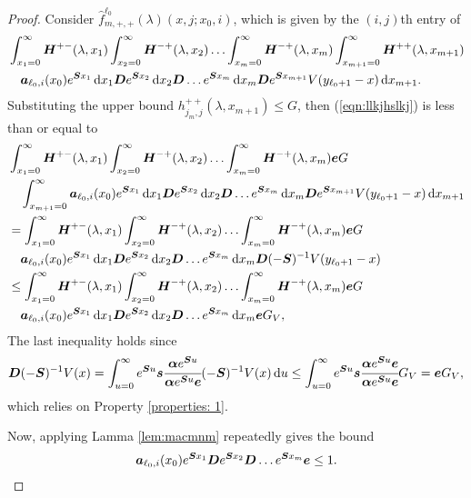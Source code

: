 \begin{proof}
	Consider \(\widehat f^{\ell_0}_{m,+,+}(\lambda)(x,j;x_0,i) \), which is given by the \((i,j)\)th entry of
        \begin{align}
        	&\int_{x_1=0}^\infty \boldsymbol H^{+-}(\lambda,x_1)\nonumber
	\int_{x_2=0}^\infty \boldsymbol H^{-+}(\lambda,x_2) 
	\hdots \int_{x_m=0}^\infty \boldsymbol H^{-+}(\lambda, x_m) 
	\int_{x_{m+1}=0}^\infty \boldsymbol H^{++}(\lambda,x_{m+1}) 
	\\&\quad\boldsymbol   a_{\ell_0,i}(x_0)e^{\boldsymbol{S}x_1}\, \mathrm{d} x_1 \boldsymbol{D}e^{\boldsymbol{S}x_2} \, \mathrm{d} x_2 \boldsymbol{D}\dots e^{\boldsymbol{S}x_m} \, \mathrm{d} x_m \boldsymbol{D}e^{\boldsymbol{S}x_{m+1}}V(y_{\ell_0+1}-x) \, \mathrm{d} x_{m+1}. \label{eqn:llkjhslkj}
\end{align}
	Substituting the upper bound \(h^{++}_{j_m,j}(\lambda,x_{m+1})\leq G\), then (\ref{eqn:llkjhslkj}) is less than or equal to 
	\begin{align}
	&\int_{x_1=0}^\infty \boldsymbol H^{+-}(\lambda,x_1)\nonumber
	\int_{x_2=0}^\infty \boldsymbol H^{-+}(\lambda,x_2) 
	\hdots \int_{x_m=0}^\infty \boldsymbol H^{-+}(\lambda, x_m) \boldsymbol eG
	\\&\quad\int_{x_{m+1}=0}^\infty \boldsymbol   a_{\ell_0,i}(x_0)e^{\boldsymbol{S}x_1}\, \mathrm{d} x_1 \boldsymbol{D}e^{\boldsymbol{S}x_2} \, \mathrm{d} x_2 \boldsymbol{D}\dots e^{\boldsymbol{S}x_m} \, \mathrm{d} x_m \boldsymbol{D}e^{\boldsymbol{S}x_{m+1}}V(y_{\ell_0+1}-x)\, \mathrm{d} x_{m+1} \nonumber
	\\&=\int_{x_1=0}^\infty \boldsymbol H^{+-}(\lambda,x_1)\nonumber
	\int_{x_2=0}^\infty \boldsymbol H^{-+}(\lambda,x_2) 
	\hdots \int_{x_m=0}^\infty \boldsymbol H^{-+}(\lambda, x_m) \boldsymbol eG
	\\&\quad \boldsymbol   a_{\ell_0,i}(x_0)e^{\boldsymbol{S}x_1}\, \mathrm{d} x_1 \boldsymbol{D}e^{\boldsymbol{S}x_2} \, \mathrm{d} x_2 \boldsymbol{D}\dots e^{\boldsymbol{S}x_m} \, \mathrm{d} x_m \boldsymbol{D}(-\boldsymbol{S})^{-1}V(y_{\ell_0+1}-x) \nonumber
	\\&\leq\int_{x_1=0}^\infty \boldsymbol H^{+-} (\lambda,x_1)\nonumber
	\int_{x_2=0}^\infty \boldsymbol H^{-+} (\lambda,x_2) 
	\hdots \int_{x_m=0}^\infty \boldsymbol H^{-+} (\lambda, x_m) \boldsymbol eG
	\\&\quad\boldsymbol   a_{\ell_0,i}(x_0)e^{\boldsymbol{S}x_1}\, \mathrm{d} x_1 \boldsymbol{D}e^{\boldsymbol{S}x_2} \, \mathrm{d} x_2 \boldsymbol{D}\dots e^{\boldsymbol{S}x_m} \, \mathrm{d} x_m \boldsymbol eG_V, \label{eqn: this 12}	
        \end{align}
        The last inequality holds since 
        \[\boldsymbol D(-\boldsymbol S)^{-1}V(x) = \int_{u=0}^\infty e^{\boldsymbol Su}\boldsymbol s\cfrac{\boldsymbol \alpha e^{\boldsymbol S u}}{\boldsymbol \alpha e^{\boldsymbol S u}\boldsymbol e}(-\boldsymbol S)^{-1}V(x)\, \mathrm{d} u \leq \int_{u=0}^\infty e^{\boldsymbol Su}\boldsymbol s\cfrac{\boldsymbol \alpha e^{\boldsymbol S u}\boldsymbol e}{\boldsymbol \alpha e^{\boldsymbol S u}\boldsymbol e}G_V = \boldsymbol eG_V,\]
        which relies on Property \ref{properties: 1}. 
        
	Now, applying Lamma \ref{lem:macmnm} repeatedly gives the bound  
	\[\boldsymbol   a_{\ell_0,i}(x_0)e^{\boldsymbol{S}x_1}\boldsymbol{D}e^{\boldsymbol{S}x_2} \boldsymbol{D}\dots e^{\boldsymbol{S}x_m} \boldsymbol e \leq 1.\]


\end{proof}
